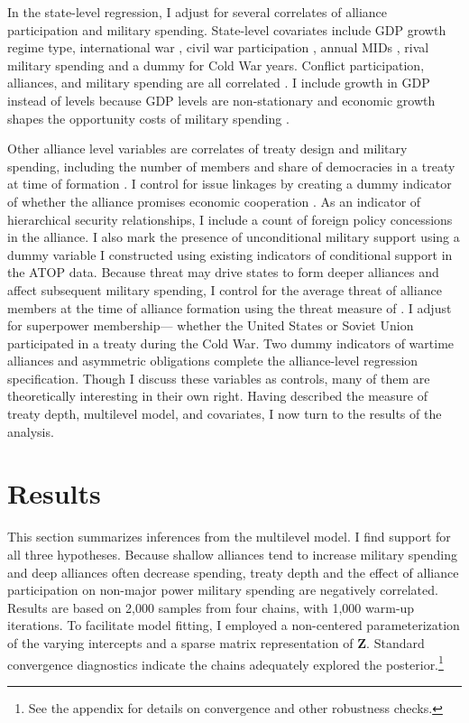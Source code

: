 \documentclass[12pt]{article}
\begin{document}
In the state-level regression, I adjust for several correlates of alliance participation and military spending. 
State-level covariates include GDP growth \citep{Boltetal2018} regime type, international war \citep{Reiteretal2016}, civil war participation \citep{SarkeesWayman2010}, annual MIDs \citep{Gibleretal2016}, rival military spending \citep{ThompsonDreyer2012} and a dummy for Cold War years.
Conflict participation, alliances, and military spending are all correlated \citep{SeneseVasquez2008}.
I include growth in GDP instead of levels because GDP levels are non-stationary and economic growth shapes the opportunity costs of military spending \citep{Kimball2010, Zielinskietal2017}.  

 
Other alliance level variables are correlates of treaty design and military spending, including the number of members and share of democracies in a treaty at time of formation \citep{Chibaetal2015}. 
I control for issue linkages by creating a dummy indicator of whether the alliance promises economic cooperation \citep{Poast2013, LongLeeds2006}. 
As an indicator of hierarchical security relationships, I include a count of foreign policy concessions in the alliance. 
I also mark the presence of unconditional military support using a dummy variable I constructed using existing indicators of conditional support in the ATOP data. 
Because threat may drive states to form deeper alliances and affect subsequent military spending, I control for the average threat of alliance members at the time of alliance formation using the threat measure of \citet{LeedsSavun2007}. 
I adjust for superpower membership--- whether the United States or Soviet Union participated in a treaty during the Cold War. 
Two dummy indicators of wartime alliances and asymmetric obligations \citep{Leedsetal2002} complete the alliance-level regression specification. 
Though I discuss these variables as controls, many of them are theoretically interesting in their own right. 
Having described the measure of treaty depth, multilevel model, and covariates, I now turn to the results of the analysis. 

 

\section{Results}


This section summarizes inferences from the multilevel model. 
I find support for all three hypotheses. 
Because shallow alliances tend to increase military spending and deep alliances often decrease spending, treaty depth and the effect of alliance participation on non-major power military spending are negatively correlated. 
Results are based on 2,000 samples from four chains, with 1,000 warm-up iterations. 
To facilitate model fitting, I employed a non-centered parameterization of the varying intercepts and a sparse matrix representation of \textbf{Z}. 
Standard convergence diagnostics indicate the chains adequately explored the posterior.\footnote{See the appendix for details on convergence and other robustness checks.} 
\end{document}
